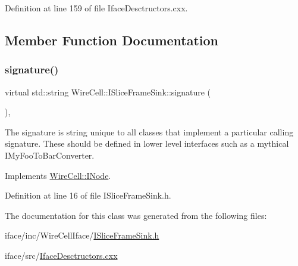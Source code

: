 Definition at line 159 of file Iface\+Desctructors.\+cxx.



\subsection{Member Function Documentation}
\mbox{\label{class_wire_cell_1_1_i_slice_frame_sink_acbe280d082cb788d8101afe67e0f2eaf}} 
\subsubsection{\texorpdfstring{signature()}{signature()}}
{\footnotesize\ttfamily virtual std\+::string Wire\+Cell\+::\+I\+Slice\+Frame\+Sink\+::signature (\begin{DoxyParamCaption}{ }\end{DoxyParamCaption})\hspace{0.3cm}{\ttfamily [inline]}, {\ttfamily [virtual]}}

The signature is string unique to all classes that implement a particular calling signature. These should be defined in lower level interfaces such as a mythical I\+My\+Foo\+To\+Bar\+Converter. 

Implements \hyperlink{class_wire_cell_1_1_i_node_a0b0763465adf5ba7febe8e378162b584}{Wire\+Cell\+::\+I\+Node}.



Definition at line 16 of file I\+Slice\+Frame\+Sink.\+h.



The documentation for this class was generated from the following files\+:\begin{DoxyCompactItemize}
\item 
iface/inc/\+Wire\+Cell\+Iface/\hyperlink{_i_slice_frame_sink_8h}{I\+Slice\+Frame\+Sink.\+h}\item 
iface/src/\hyperlink{_iface_desctructors_8cxx}{Iface\+Desctructors.\+cxx}\end{DoxyCompactItemize}
